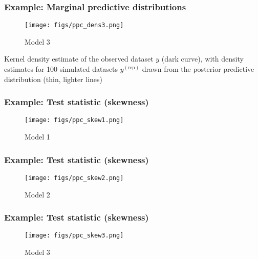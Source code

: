 \documentclass[10pt]{beamer}
\begin{document}
\begin{frame}
\frametitle{Example: Marginal predictive distributions}

\begin{figure}
\centering
\texttt{[image: figs/ppc\_dens3.png]}
\caption{Model 3}
\end{figure}
Kernel density estimate of the observed dataset $y$ (dark curve), with density
estimates for 100 simulated datasets $y^{(\text{rep})}$ drawn from the posterior predictive distribution (thin, lighter lines)

\end{frame}


\begin{frame}
\frametitle{Example: Test statistic (skewness)}

\begin{figure}
\centering
\texttt{[image: figs/ppc\_skew1.png]}
\caption{Model 1}
\end{figure}

\end{frame}

\begin{frame}
\frametitle{Example: Test statistic (skewness)}

\begin{figure}
\centering
\texttt{[image: figs/ppc\_skew2.png]}
\caption{Model 2}
\end{figure}


\end{frame}

\begin{frame}
\frametitle{Example: Test statistic (skewness)}

\begin{figure}
\centering
\texttt{[image: figs/ppc\_skew3.png]}
\caption{Model 3}
\end{figure}

\end{frame}

\end{document}
